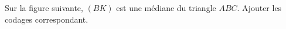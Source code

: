 
\begin{exercice}\label{exosmath-0929}

    Sur la figure suivante, \( (BK)\) est une médiane du triangle \( ABC\). Ajouter les codages correspondant.
\begin{center}
   
\end{center}

\end{exercice}
